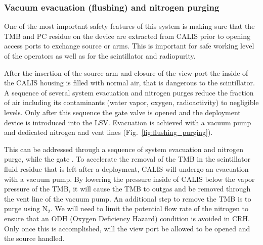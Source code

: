 \subsubsection*{Vacuum evacuation (flushing) and nitrogen purging}
One of the most important safety features of this system is making sure that the TMB and PC residue on the device are extracted from CALIS prior to opening access ports to exchange source or arms. This is  important for safe working level of the operators as well as for the scintillator and radiopurity. 

After the insertion of the source arm and closure of the view port the inside of the CALIS housing is filled with normal air, that is dangerous to the scintillator. A sequence of several system evacuation and nitrogen purges reduce the fraction of air including its contaminants (water vapor, oxygen, radioactivity) to negligible levels. Only after this sequence the gate valve is opened and the deployment device is introduced into the LSV. Evacuation is achieved with a vacuum pump and dedicated nitrogen and vent lines (Fig.~\ref{fig:flushing_purging}).

This can be addressed through a sequence of system evacuation and nitrogen purge, while the gate . To accelerate the removal of the TMB in the scintillator fluid residue that is left after a deployment, CALIS will undergo an evacuation with a vacuum pump. By lowering the pressure inside of CALIS below the vapor pressure of the TMB, it will cause the TMB to outgas and be removed through the vent line of the vacuum pump. An additional step to remove the TMB is to purge using N$_{2}$.  We will need to limit the potential flow rate of the nitrogen to ensure that an ODH (Oxygen Deficiency Hazard) condition is avoided in CRH.  Only once this is accomplished, will the view port be allowed to be opened and the source handled.     
 
